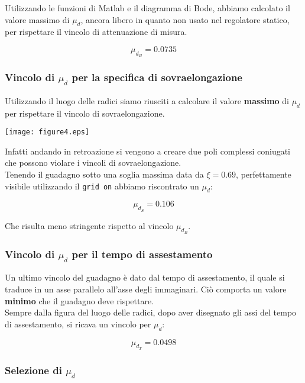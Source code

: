 \documentclass{article}
\begin{document}
Utilizzando le funzioni di Matlab e il diagramma di Bode, abbiamo calcolato il valore massimo di $\mu_d$, ancora libero in quanto non usato nel regolatore statico, per rispettare il vincolo di attenuazione di misura.

$$
    \mu_{d_B}=0.0735
$$

\newpage

\subsubsection{Vincolo di $\mu_d$ per la specifica di sovraelongazione}

Utilizzando il luogo delle radici siamo riusciti a calcolare il valore \textbf{massimo} di $\mu_d$ per rispettare il vincolo di sovraelongazione.

\begin{center}
    \texttt{[image: figure4.eps]}
\end{center}
Infatti andando in retroazione si vengono a creare due poli complessi coniugati che possono violare i vincoli di sovraelongazione.\\
Tenendo il guadagno sotto una soglia massima data da $\xi=0.69$, perfettamente visibile utilizzando il \texttt{grid on} abbiamo riscontrato un $\mu_d$:

$$
    \mu_{d_S} = 0.106
$$

Che risulta meno stringente rispetto al vincolo $\mu_{d_B}$.

\subsubsection{Vincolo di $\mu_d$ per il tempo di assestamento}

Un ultimo vincolo del guadagno è dato dal tempo di assestamento, il quale si traduce in un asse parallelo all'asse degli immaginari. Ciò comporta un valore \textbf{minimo} che il guadagno deve rispettare.\\

Sempre dalla figura del luogo delle radici, dopo aver disegnato gli assi del tempo di assestamento, si ricava un vincolo per $\mu_d$:

$$
    \mu_{d_T} = 0.0498
$$

\newpage

\subsubsection{Selezione di $\mu_d$}
\end{document}
